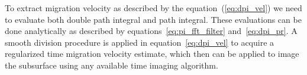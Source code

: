 To extract migration velocity as described by the equation~(\ref{eq:dpi_vel}) we need to
evaluate both double path integral and path integral. These evaluations can be done 
analytically as described by equations~\ref{eq:pi_fft_filter} and~\ref{eq:dpi_pr}. A smooth division
procedure  is applied in equation~\ref{eq:dpi_vel} to acquire a regularized time migration velocity estimate, which
then can be applied to image the subsurface using any available time imaging algorithm.




